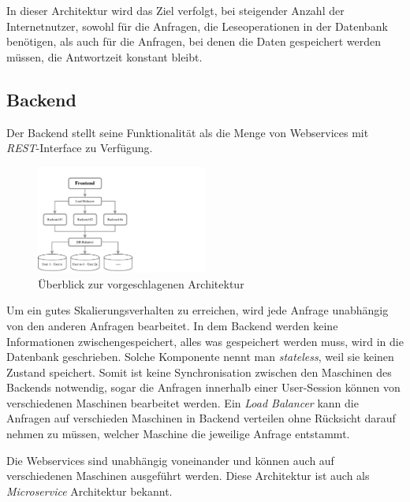 In dieser Architektur wird das Ziel verfolgt, bei steigender Anzahl der Internetnutzer, sowohl für die Anfragen, die Leseoperationen in der Datenbank benötigen, als auch für die Anfragen, bei denen die Daten gespeichert werden müssen, die Antwortzeit konstant bleibt.

\subsection{Backend}

Der Backend stellt seine Funktionalität als die Menge von Webservices mit \textit{REST}-Interface zu Verfügung.

\begin{figure}[H]
\centering
\includegraphics[trim = 0mm 0mm 0mm 0mm, clip, width=0.5\textwidth]{resources/ueberblickArchitektur}
\caption[Überblick zur vorgeschlagenen Architektur]{Überblick zur vorgeschlagenen Architektur}
\label{img:ueberblickArchitektur}
\end{figure}

Um ein gutes Skalierungsverhalten zu erreichen, wird jede Anfrage unabhängig von den anderen Anfragen bearbeitet. In dem Backend werden keine Informationen zwischengespeichert, alles was gespeichert werden muss, wird in die Datenbank geschrieben. Solche Komponente nennt man \textit{stateless}, weil sie keinen Zustand speichert. Somit ist keine Synchronisation zwischen den Maschinen des Backends notwendig, sogar die Anfragen innerhalb einer User-Session können von verschiedenen Maschinen bearbeitet werden. Ein \textit{Load Balancer} kann die Anfragen auf verschieden Maschinen in Backend verteilen ohne Rücksicht darauf nehmen zu müssen, welcher Maschine die jeweilige Anfrage entstammt.

Die Webservices sind unabhängig voneinander und können auch auf verschiedenen Maschinen ausgeführt werden. Diese Architektur ist auch als \textit{Microservice} Architektur bekannt.

